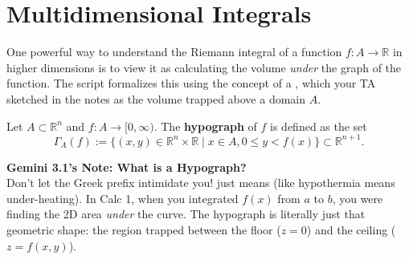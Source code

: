\section{Multidimensional Integrals} %


One powerful way to understand the Riemann integral of a function $f: A \to \mathbb{R}$ in higher dimensions is to view it as calculating the volume \textit{under} the graph of the function. The script formalizes this using the concept of a , which your TA sketched in the notes as the volume trapped above a domain $A$.

\setcounter{savedSecMulti}{\value{section}}
\setcounter{savedThmMulti}{\value{theorem}}
\setcounter{section}{13}
\setcounter{theorem}{39} 

\begin{definition}[Hypograph]
Let $A \subset \mathbb{R}^n$ and $f : A \to [0, \infty)$. The \textbf{hypograph} of $f$ is defined as the set
\[
\Gamma_A(f) := \{ (x, y) \in \mathbb{R}^n \times \mathbb{R} \mid x \in A, 0 \le y < f(x) \} \subset \mathbb{R}^{n+1}.
\]
\end{definition}

\setcounter{section}{\value{savedSecMulti}}
\setcounter{theorem}{\value{savedThmMulti}}

\begin{extra}
\textbf{Gemini 3.1's Note: What is a Hypograph?}\\
Don't let the Greek prefix intimidate you!  just means  (like hypothermia means under-heating). In Calc 1, when you integrated $f(x)$ from $a$ to $b$, you were finding the 2D area \textit{under} the curve. The hypograph is literally just that geometric shape: the region trapped between the floor ($z=0$) and the ceiling ($z=f(x,y)$). 
\end{extra}

